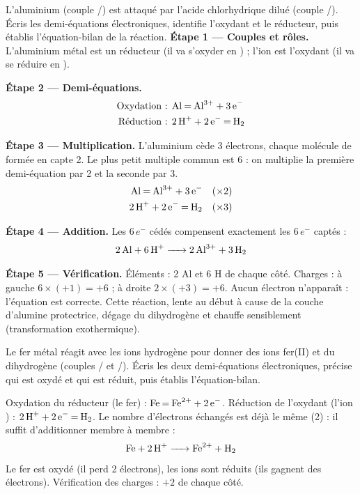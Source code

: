 \documentclass[11pt]{article}
\begin{document}
\begin{exoresolu}
L'aluminium  (couple /) est attaqué par l'acide chlorhydrique dilué (couple /). Écris les demi-équations électroniques, identifie l'oxydant et le réducteur, puis établis l'équation-bilan de la réaction.
\tcblower
\textbf{Étape 1 — Couples et rôles.} L'aluminium métal  est un réducteur (il va s'oxyder en ) ; l'ion  est l'oxydant (il va se réduire en ).

\textbf{Étape 2 — Demi-équations.}
\begin{align*}
\text{Oxydation : } & \ce{Al = Al^{3+} + 3e-} \\
\text{Réduction : } & \ce{2H+ + 2e- = H2}
\end{align*}

\textbf{Étape 3 — Multiplication.} L'aluminium cède 3 électrons, chaque molécule de  formée en capte 2. Le plus petit multiple commun est 6 : on multiplie la première demi-équation par 2 et la seconde par 3.
\begin{align*}
\ce{Al = Al^{3+} + 3e-} \quad &(\times 2) \\
\ce{2H+ + 2e- = H2} \quad &(\times 3)
\end{align*}

\textbf{Étape 4 — Addition.} Les $6\,e^-$ cédés compensent exactement les $6\,e^-$ captés :
\[ \ce{2Al + 6H+ -> 2Al^{3+} + 3H2} \]

\textbf{Étape 5 — Vérification.} Éléments : 2 Al et 6 H de chaque côté. Charges : à gauche $6 \times (+1) = +6$ ; à droite $2 \times (+3) = +6$. Aucun électron n'apparaît : l'équation est correcte. Cette réaction, lente au début à cause de la couche d'alumine protectrice, dégage du dihydrogène et chauffe sensiblement (transformation exothermique).
\end{exoresolu}

\begin{exercice}
Le fer métal  réagit avec les ions hydrogène  pour donner des ions fer(II)  et du dihydrogène (couples / et /). Écris les deux demi-équations électroniques, précise qui est oxydé et qui est réduit, puis établis l'équation-bilan.
\end{exercice}

\begin{corrige}
Oxydation du réducteur (le fer) : $\ce{Fe = Fe^{2+} + 2e-}$. Réduction de l'oxydant (l'ion ) : $\ce{2H+ + 2e- = H2}$. Le nombre d'électrons échangés est déjà le même (2) : il suffit d'additionner membre à membre :
\[ \ce{Fe + 2H+ -> Fe^{2+} + H2} \]
Le fer est oxydé (il perd 2 électrons), les ions  sont réduits (ils gagnent des électrons). Vérification des charges : $+2$ de chaque côté.
\end{corrige}
\end{document}
